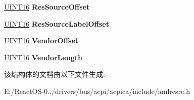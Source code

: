 \begin{DoxyCompactItemize}
\hyperlink{_processor_bind_8h_a09f1a1fb2293e33483cc8d44aefb1eb1}{U\+I\+N\+T16} {\bfseries Res\+Source\+Offset}
\item 
\mbox{\label{structaml__resource__pin__group__config_a8b25f7744b9e21decc332a5ab9a0a005}} 
\hyperlink{_processor_bind_8h_a09f1a1fb2293e33483cc8d44aefb1eb1}{U\+I\+N\+T16} {\bfseries Res\+Source\+Label\+Offset}
\item 
\mbox{\label{structaml__resource__pin__group__config_afe5a736643ff6dbd6f9bb4883c49e598}} 
\hyperlink{_processor_bind_8h_a09f1a1fb2293e33483cc8d44aefb1eb1}{U\+I\+N\+T16} {\bfseries Vendor\+Offset}
\item 
\mbox{\label{structaml__resource__pin__group__config_aee2857836b8511d37b2adcb5dea9e2c9}} 
\hyperlink{_processor_bind_8h_a09f1a1fb2293e33483cc8d44aefb1eb1}{U\+I\+N\+T16} {\bfseries Vendor\+Length}
\end{DoxyCompactItemize}


该结构体的文档由以下文件生成\+:\begin{DoxyCompactItemize}
\item 
E\+:/\+React\+O\+S-\/0../drivers/bus/acpi/acpica/include/amlresrc.\+h\end{DoxyCompactItemize}
